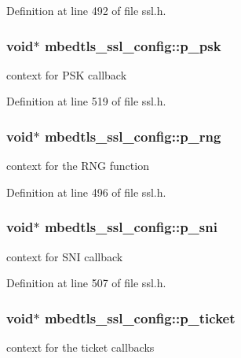 Definition at line 492 of file ssl.\-h.

\hypertarget{structmbedtls__ssl__config_ad42f2396c9758b6866d61342094a0a7d}{
\subsubsection[{p\-\_\-psk}]{\setlength{\rightskip}{0pt plus 5cm}void$\ast$ mbedtls\-\_\-ssl\-\_\-config\-::p\-\_\-psk}}\label{structmbedtls__ssl__config_ad42f2396c9758b6866d61342094a0a7d}
context for P\-S\-K callback 

Definition at line 519 of file ssl.\-h.

\hypertarget{structmbedtls__ssl__config_a1eff6c9817251b686e8f518597590476}{
\subsubsection[{p\-\_\-rng}]{\setlength{\rightskip}{0pt plus 5cm}void$\ast$ mbedtls\-\_\-ssl\-\_\-config\-::p\-\_\-rng}}\label{structmbedtls__ssl__config_a1eff6c9817251b686e8f518597590476}
context for the R\-N\-G function 

Definition at line 496 of file ssl.\-h.

\hypertarget{structmbedtls__ssl__config_a1ae68f4bd072068c60222866c0ea2f62}{
\subsubsection[{p\-\_\-sni}]{\setlength{\rightskip}{0pt plus 5cm}void$\ast$ mbedtls\-\_\-ssl\-\_\-config\-::p\-\_\-sni}}\label{structmbedtls__ssl__config_a1ae68f4bd072068c60222866c0ea2f62}
context for S\-N\-I callback 

Definition at line 507 of file ssl.\-h.

\hypertarget{structmbedtls__ssl__config_a0dab7f9f4f2c85644ebe32f8e37984dc}{
\subsubsection[{p\-\_\-ticket}]{\setlength{\rightskip}{0pt plus 5cm}void$\ast$ mbedtls\-\_\-ssl\-\_\-config\-::p\-\_\-ticket}}\label{structmbedtls__ssl__config_a0dab7f9f4f2c85644ebe32f8e37984dc}
context for the ticket callbacks 

